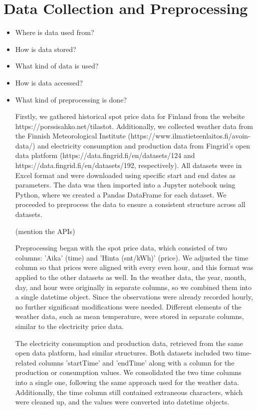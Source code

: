 \documentclass{article}
\numberwithin{equation}{section}
\begin{document}
\section{Data Collection and Preprocessing}
\begin{itemize}
	\item Where is data used from?
	\item How is data stored?
	\item What kind of data is used?
	\item How is data accessed?
	\item What kind of preprocessing is done?

	Firstly, we gathered historical spot price data for Finland from the website https://porssisahko.net/tilastot. Additionally, we collected weather data from the Finnish Meteorological Institute (https://www.ilmatieteenlaitos.fi/avoin-data/) and electricity consumption and production data from Fingrid's open data platform (https://data.fingrid.fi/en/datasets/124 and https://data.fingrid.fi/en/datasets/192, respectively). All datasets were in Excel format and were downloaded using specific start and end dates as parameters. The data was then imported into a Jupyter notebook using Python, where we created a Pandas DataFrame for each dataset. We proceeded to preprocess the data to ensure a consistent structure across all datasets.

(mention the APIs)

Preprocessing began with the spot price data, which consisted of two columns: 'Aika' (time) and 'Hinta (snt/kWh)' (price). We adjusted the time column so that prices were aligned with every even hour, and this format was applied to the other datasets as well. In the weather data, the year, month, day, and hour were originally in separate columns, so we combined them into a single datetime object. Since the observations were already recorded hourly, no further significant modifications were needed. Different elements of the weather data, such as mean temperature, were stored in separate columns, similar to the electricity price data.

The electricity consumption and production data, retrieved from the same open data platform, had similar structures. Both datasets included two time-related columns 'startTime' and 'endTime' along with a column for the production or consumption values. We consolidated the two time columns into a single one, following the same approach used for the weather data. Additionally, the time column still contained extraneous characters, which were cleaned up, and the values were converted into datetime objects.


\end{itemize}
\end{document}
